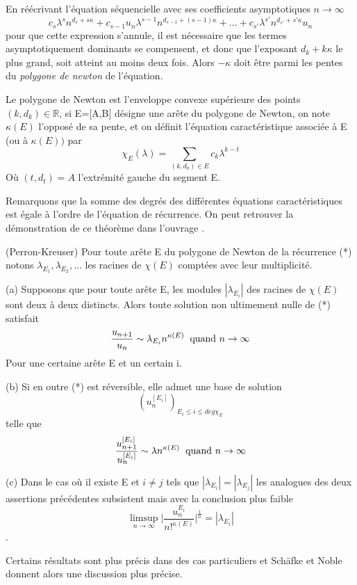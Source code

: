 \documentclass[a4paper,10.5pt]{article}
\begin{document}
	\noindent En réécrivant l'équation séquencielle avec ses coefficients asymptotiques $n \rightarrow \infty$
	\[c_{s}\lambda^{s} n^{d_{s}+s\kappa}+c_{s-1}u_{n}\lambda^{s-1} n^{d_{s-1}+(s-1)\kappa}+...+c_{s'}\lambda^{s'} n^{d_{s'}+s'\kappa}u_{n}\]
	pour que cette expression s'annule, il est nécessaire que les termes asymptotiquement dominants se compensent, et donc que l'exposant $d_{k}+k\kappa$ le plus grand, soit atteint au moins deux fois. Alors $-\kappa$ doit être parmi les pentes du \textit{polygone de newton} de l'équation.
	
	
	\begin{definition} Le polygone de Newton est l'enveloppe convexe supérieure des points $(k, d_{k}) \in \mathbb{R}$, si E=[A,B] désigne une arête du polygone de Newton, on note $\kappa(E)$ l'opposé de sa pente, et on définit l'équation caractéristique associée à E (ou à $\kappa(E))$ par
		\[\chi_{E}(\lambda)=\sum_{(k,d_{k}) \in E} c_{k}\lambda^{k-t}\]
		Où $(t,d_{t})=A$ l'extrémité gauche du segment E.
	\end{definition}
	
	Remarquons que la somme des degrés des différentes équations caractéristiques est égale à l'ordre de l'équation de récurrence. On peut retrouver la démonstration de ce théorème dans l'ouvrage \cite{hp1885aj}.
	\begin{theorem} (Perron-Kreuser)
		Pour toute arête E du polygone de Newton de la récurrence (*) notons $\lambda_{E_{1}},\lambda_{E_{2}},...$ les racines de $\chi(E)$ comptées avec leur multiplicité.
		
		(a) Supposons que pour toute arête E, les modules $|\lambda_{E_{i}}|$ des racines de $\chi(E)$ sont deux à deux distincts. Alors toute solution non ultimement nulle de (*) satisfait
		\[\frac{u_{n+1}}{u_{n}}\sim \lambda_{E_{i}}n^{\kappa(E)} \hspace{2mm} \text{quand } n \rightarrow \infty\]
		Pour une certaine arête E et un certain i.
		
		(b) Si en outre (*) est réversible, elle admet une base de solution 
		\[(u_{n}^{[E_{i}]})_{E_{i}\leq i \leq deg \chi_{E}}\]
		telle que 
		\[\frac{u_{n+1}^{[E_{i}]}}{u_{n}^{[E_{i}]}}\sim \lambda n^{\kappa(E)} \hspace{2mm} \text{quand } n \rightarrow \infty\]
		
		(c) Dans le cas où il existe E et $i \neq j$ tels que $|\lambda_{E_{i}}|=|\lambda_{E_{j}}|$ les analogues des deux assertions précédentes subsistent mais avec la conclusion plus faible
		\[\limsup_{n \rightarrow \infty } \big|\frac{u_{n}^{E_{i}}}{n!^{\kappa(E)}}\big|^{\frac{1}{n}}=|\lambda_{E_{i}}|\].
	\end{theorem}
	\vspace{7mm}
	Certains résultats sont plus précis dans des cas particuliers et Schäfke et Noble donnent alors une discussion plus précise.
	
\end{document}
